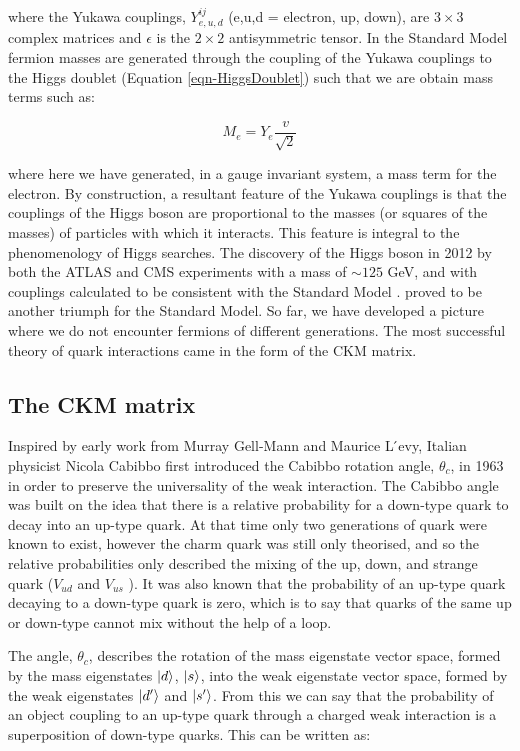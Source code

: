 where the Yukawa couplings, $Y^{ij}_{e,u,d}$ (e,u,d = electron, up, down), are $3\times3$ complex matrices and $\epsilon$ is the $2\times2$ antisymmetric tensor. In the Standard Model fermion masses are generated through the coupling of the Yukawa couplings to the Higgs doublet (Equation \ref{eqn-HiggsDoublet}) such that we are obtain mass terms such as:

\begin{equation}
M_e = Y_e\frac{v}{\sqrt{2}}
\end{equation}

where here we have generated, in a gauge invariant system, a mass term for the electron. By construction, a resultant feature of the Yukawa couplings is that the couplings of the Higgs boson are proportional to the masses (or squares of the masses) of particles with which it interacts. This feature is integral to the phenomenology of Higgs searches. The discovery of the Higgs boson in 2012 by both the ATLAS \cite{Aad:2012tfa} and CMS \cite{b846af59f42d440a9058d93ed5df44cf} experiments with a mass of $\sim125$ GeV, and with couplings calculated to be consistent with the Standard Model \cite{Chatrchyan:2013lba, Aad:2013wqa}. proved to be another triumph for the Standard Model. So far, we have developed a picture where we do not encounter fermions of different generations. The most successful theory of quark interactions came in the form of the CKM matrix.

\subsection{The CKM matrix}

Inspired by early work from Murray Gell-Mann and Maurice L ́evy, Italian physicist Nicola Cabibbo first introduced the Cabibbo rotation angle, $θ_c$, in 1963 \cite{PhysRevLett.10.531} in order to preserve the universality of the weak interaction. The Cabibbo angle was built on the idea that there is a relative probability for a down-type quark to decay into an up-type quark. At that time only two generations of quark were known to exist, however the charm quark was still only theorised, and so the relative probabilities only described the mixing of the up, down,
and strange quark ($V_{ud}$ and $V_{us}$ ). It was also known that the probability of an up-type quark decaying to a down-type quark is zero, which is to say that quarks of the same up or down-type cannot mix without the help of a loop.

The angle, $θ_c$, describes the rotation of the mass eigenstate vector space, formed by the mass eigenstates $\ket{d}$, $\ket{s}$, into the weak eigenstate vector space, formed by the weak eigenstates $\ket{d'}$ and $\ket{s'}$. From this we can say that the probability of an object coupling to an up-type quark through a charged weak interaction is a superposition of down-type quarks. This can be written as:

